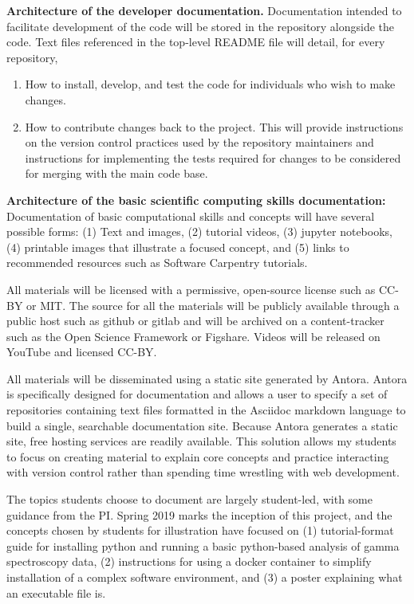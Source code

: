 \textbf{Architecture of the developer documentation.}  Documentation intended to facilitate development of the code will be stored in the repository alongside the code.  Text files referenced in the top-level README file will detail, for every repository,

\begin{enumerate}
    \item How to install, develop, and test the code for individuals who wish to make changes.  
    \item How to contribute changes back to the project.  This will provide instructions on the version control practices used by the repository maintainers and instructions for implementing the tests required for changes to be considered for merging with the main code base.
\end{enumerate}

\textbf{Architecture of the basic scientific computing skills documentation:}  Documentation of basic computational skills and concepts will have several possible forms: (1) Text and images, (2) tutorial videos, (3) jupyter notebooks, (4) printable images that illustrate a focused concept, and (5) links to recommended resources such as Software Carpentry tutorials.

All materials will be licensed with  a permissive, open-source license such as CC-BY or MIT.  The source for all the materials will be publicly available through a public host such as github or gitlab and will be archived on a content-tracker such as the Open Science Framework or Figshare.  Videos will be released on YouTube and licensed CC-BY.

All materials will be disseminated using a static site generated by Antora.  Antora is specifically designed for documentation and allows a user to specify a set of repositories containing text files formatted in the Asciidoc markdown language to build a single, searchable documentation site.  Because Antora generates a static site, free hosting services are readily available.  This solution allows my students to focus on creating material to explain core concepts and practice interacting with version control rather than spending time wrestling with web development.

The topics students choose to document are largely student-led, with some guidance from the PI.  Spring 2019 marks the inception of this project, and the concepts chosen by students for illustration have focused on (1) tutorial-format guide for installing python and running a basic python-based analysis of gamma spectroscopy data, (2) instructions for using a docker container to simplify installation of a complex software environment, and (3) a poster explaining what an executable file is.


